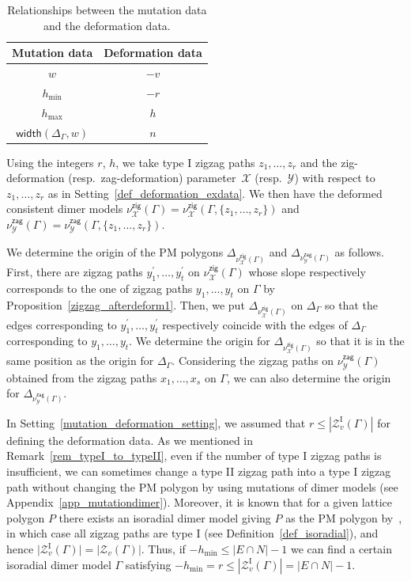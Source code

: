 \documentclass[11pt]{article}
\numberwithin{equation}{section}
\numberwithin{equation}{section}
\numberwithin{figure}{section}
\numberwithin{table}{section}
\newcommand{\rmI}{\mathrm{I}}
\newcommand{\calX}{\mathcal{X}}
\newcommand{\calY}{\mathcal{Y}}
\newcommand{\calZ}{\mathcal{Z}}
\newcommand{\zig}{\mathsf{zig}}
\newcommand{\zag}{\mathsf{zag}}
\newcommand{\width}{\mathsf{width}}
\begin{document}
\begin{setting}
\begin{table}[h!]\centering
\begin{tabular}{|c|c|}
\hline
Mutation data&Deformation data \\ \hline
$w$&$-v$ \\ \hline
$h_{\min}$&$-r$\\ \hline
$h_{\max}$&$h$ \\ \hline
$\width(\Delta_\Gamma,w)$&$n$ \\ \hline
\end{tabular}

\caption{Relationships between the mutation data and the deformation data.}\label{mutation_deformation_data}
\end{table}

Using the integers $r$, $h$, we take type I zigzag paths $z_1,\dots,z_r$ and the zig-deformation (resp.\ zag-deformation) parameter~$\calX$ (resp.~$\calY$) with respect to $z_1,\dots,z_r$ as in Setting~\ref{def_deformation_exdata}.
We then have the deformed consistent dimer models $\nu^\zig_\calX(\Gamma)=\nu^\zig_\calX(\Gamma, \{z_1,\dots,z_r\})$
and $\nu^\zag_\calY(\Gamma)=\nu^\zag_\calY(\Gamma, \{z_1,\dots,z_r\})$.

We determine the origin of the PM polygons $\Delta_{\nu^\zig_\calX(\Gamma)}$ and $\Delta_{\nu^\zag_\calY(\Gamma)}$ as follows.
First, there are zigzag paths $y_1^\prime,\dots,y_t^\prime$ on $\nu^\zig_\calX(\Gamma)$ whose slope respectively corresponds to the one of zigzag paths $y_1,\dots, y_t$ on $\Gamma$ by Proposition~\ref{zigzag_afterdeform1}.
Then, we put $\Delta_{\nu^\zig_\calX(\Gamma)}$ on $\Delta_\Gamma$ so that the edges corresponding to $y_1^\prime,\dots,y_t^\prime$ respectively coincide with the edges of $\Delta_\Gamma$ corresponding to $y_1,\dots,y_t$.
We determine the origin for $\Delta_{\nu^\zig_\calX(\Gamma)}$ so that it is in the same position as the origin for $\Delta_\Gamma$.
Considering the zigzag paths on $\nu^\zag_\calY(\Gamma)$ obtained from the zigzag paths $x_1,\dots,x_s$ on $\Gamma$,
we can also determine the origin for $\Delta_{\nu^\zag_\calY(\Gamma)}$.
\end{setting}

\begin{Remark}
\label{rem_typeI_isoradial}
In Setting~\ref{mutation_deformation_setting}, we assumed that $r\le|\calZ_v^\rmI(\Gamma)|$ for defining the deformation data.
As we mentioned in Remark~\ref{rem_typeI_to_typeII}, even if the number of type I zigzag paths is insufficient,
we can sometimes change a type II zigzag path into a type I zigzag path without changing the PM polygon by using mutations of dimer models (see Appendix~\ref{app_mutationdimer}).
Moreover, it is known that for a given lattice polygon $P$ there exists an isoradial dimer model giving $P$ as the PM polygon by~\cite{Gul}, in which case all zigzag paths are type I (see Definition~\ref{def_isoradial}), and hence $\big|\calZ_v^\rmI(\Gamma)\big|=|\calZ_v(\Gamma)|$.
Thus, if $-h_{\min}\le|E\cap N|-1$ we can find a certain isoradial dimer model $\Gamma$ satisfying $-h_{\min}=r\le|\calZ_v^{\rmI}(\Gamma)|=|E\cap N|-1$.
\end{Remark}
\end{document}
